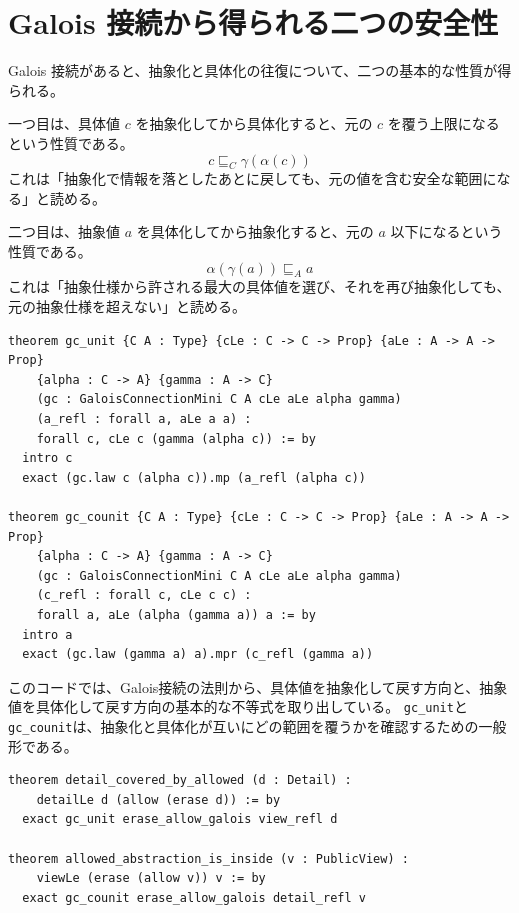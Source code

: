 
\section{Galois 接続から得られる二つの安全性}

Galois 接続があると、抽象化と具体化の往復について、二つの基本的な性質が得られる。

一つ目は、具体値 \(c\) を抽象化してから具体化すると、元の \(c\) を覆う上限になるという性質である。
\[
  c \sqsubseteq_C \gamma(\alpha(c))
\]
これは「抽象化で情報を落としたあとに戻しても、元の値を含む安全な範囲になる」と読める。

二つ目は、抽象値 \(a\) を具体化してから抽象化すると、元の \(a\) 以下になるという性質である。
\[
  \alpha(\gamma(a)) \sqsubseteq_A a
\]
これは「抽象仕様から許される最大の具体値を選び、それを再び抽象化しても、元の抽象仕様を超えない」と読める。

\begin{listing}[htbp]
\begin{verbatim}
theorem gc_unit {C A : Type} {cLe : C -> C -> Prop} {aLe : A -> A -> Prop}
    {alpha : C -> A} {gamma : A -> C}
    (gc : GaloisConnectionMini C A cLe aLe alpha gamma)
    (a_refl : forall a, aLe a a) :
    forall c, cLe c (gamma (alpha c)) := by
  intro c
  exact (gc.law c (alpha c)).mp (a_refl (alpha c))

theorem gc_counit {C A : Type} {cLe : C -> C -> Prop} {aLe : A -> A -> Prop}
    {alpha : C -> A} {gamma : A -> C}
    (gc : GaloisConnectionMini C A cLe aLe alpha gamma)
    (c_refl : forall c, cLe c c) :
    forall a, aLe (alpha (gamma a)) a := by
  intro a
  exact (gc.law (gamma a) a).mpr (c_refl (gamma a))
\end{verbatim}
\caption{Galois接続から得られる一般的な性質}
\label{lst:ch16-galois-consequences}
\end{listing}

このコードでは、Galois接続の法則から、具体値を抽象化して戻す方向と、抽象値を具体化して戻す方向の基本的な不等式を取り出している。
\texttt{gc\_unit}と\texttt{gc\_counit}は、抽象化と具体化が互いにどの範囲を覆うかを確認するための一般形である。

\begin{listing}[htbp]
\begin{verbatim}
theorem detail_covered_by_allowed (d : Detail) :
    detailLe d (allow (erase d)) := by
  exact gc_unit erase_allow_galois view_refl d

theorem allowed_abstraction_is_inside (v : PublicView) :
    viewLe (erase (allow v)) v := by
  exact gc_counit erase_allow_galois detail_refl v
\end{verbatim}
\caption{公開ログ例に適用した安全性}
\label{lst:ch16-galois-use}
\end{listing}


